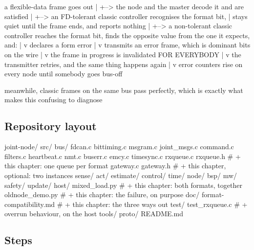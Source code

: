\begin{asciiart}
  a flexible-data frame goes out
        |
        +--> the node and the master decode it and are satisfied
        |
        +--> an FD-tolerant classic controller recognises the format bit,
        |    stays quiet until the frame ends, and reports nothing
        |
        +--> a non-tolerant classic controller reaches the format bit,
             finds the opposite value from the one it expects, and:
                  |
                  v
             declares a form error
                  |
                  v
             transmits an error frame, which is dominant bits on the wire
                  |
                  v
             the frame in progress is invalidated FOR EVERYBODY
                  |
                  v
             the transmitter retries, and the same thing happens again
                  |
                  v
             error counters rise on every node until somebody goes bus-off

  meanwhile, classic frames on the same bus pass perfectly, which is
  exactly what makes this confusing to diagnose
\end{asciiart}

\subsection*{Repository layout}

\begin{plaincode}
joint-node/
  src/
    bus/
      fdcan.c bittiming.c msgram.c joint_msgs.c command.c filters.c
      heartbeat.c nmt.c buserr.c emcy.c timesync.c
      rxqueue.c  rxqueue.h          # + this chapter: one queue per format
      gateway.c  gateway.h          # + this chapter, optional: two instances
    sense/ act/ estimate/ control/ time/ node/ bsp/
    mw/  safety/  update/
  host/
    mixed_load.py                   # + this chapter: both formats, together
    oldnode_demo.py                 # + this chapter: the failure, on purpose
  doc/
    format-compatibility.md         # + this chapter: the three ways out
  test/
    test_rxqueue.c                  # + overrun behaviour, on the host
  tools/  proto/  README.md
\end{plaincode}

\subsection*{Steps}

